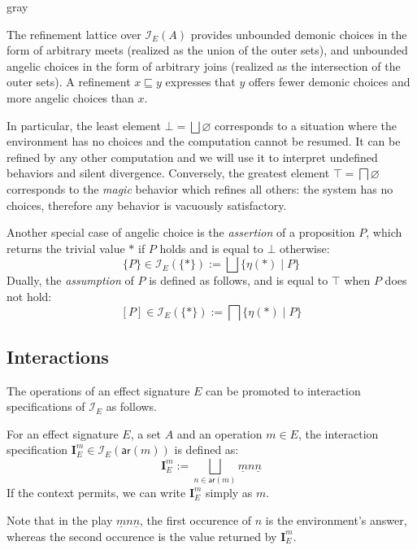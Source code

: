 \documentclass[format=sigplan,authordraft]{acmart}
\newcommand{\kw}[1]{\ensuremath{ \mathsf{#1} }}
\begin{document}
\begin{color}{gray}

The refinement lattice over $\mathcal{I}_E(A)$
provides unbounded demonic choices
in the form of arbitrary meets
(realized as the union of the outer sets),
and unbounded angelic choices
in the form of arbitrary joins
(realized as the intersection of the outer sets).
A refinement $x \sqsubseteq y$ expresses that
$y$ offers fewer demonic choices and more angelic choices than $x$.

In particular,
the least element $\bot = \bigsqcup \varnothing$
corresponds to a situation where the environment has no choices
and the computation cannot be resumed.
It can be refined by any other computation and
we will use it to interpret undefined behaviors and silent divergence.
Conversely,
the greatest element $\top = \bigsqcap \varnothing$
corresponds to the \emph{magic} behavior
which refines all others:
the system has no choices,
therefore any behavior is vacuously satisfactory.

Another special case of angelic choice is
the \emph{assertion} of a proposition $P$,
which returns the trivial value $*$ if $P$ holds
and is equal to $\bot$ otherwise:
\[ \{P\} \in \mathcal{I}_E(\{*\}) :=
    \bigsqcup \{ \eta(*) \mid P \} \]
Dually,
the \emph{assumption} of $P$
is defined as follows,
and is equal to $\top$ when $P$ does not hold:
\[ [P] \in \mathcal{I}_E(\{*\}) :=
    \bigsqcap \{ \eta(*) \mid P \} \]

\end{color}


\subsection{Interactions} %

The operations of an effect signature $E$
can be promoted to interaction specifications of $\mathcal{I}_E$
as follows.

\begin{definition}
For an effect signature $E$, a set $A$ and
an operation $m \in E$,
the interaction specification
$\mathbf{I}_E^m \in \mathcal{I}_E(\kw{ar}(m))$
is defined as:
\[
  \mathbf{I}_E^m :=
    \bigsqcup_{n \in \kw{ar}(m)} \underline{m} n \underline{n}
\]
If the context permits,
we can write $\mathbf{I}_E^m$ simply as $m$.
\end{definition}
Note that in the play $\underline{m} n \underline{n}$,
the first occurence of $n$ is the environment's answer,
whereas the second occurence is the value returned by $\mathbf{I}_E^m$.
\end{document}
